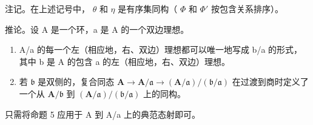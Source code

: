 注记。在上述记号中， \(\theta\) 和 \(\eta\) 是有序集同构（ \(\Phi\) 和 \(\Phi'\) 按包含关系排序）。

推论。设 A 是一个环，a 是 A 的一个双边理想。

\begin{enumerate}
\def\labelenumi{(\alph{enumi})}
\item
  A/a 的每一个左（相应地，右、双边）理想都可以唯一地写成 b/a 的形式，其中 b 是 A 的包含 a 的左（相应地，右、双边）理想。
\item
  若 \(\mathfrak{b}\) 是双侧的，复合同态 \(\mathbf{A} \to \mathbf{A} / \mathfrak{a} \to (\mathbf{A} / \mathfrak{a}) / (\mathfrak{b} / \mathfrak{a})\) 在过渡到商时定义了一个从 \(\mathbf{A} / \mathfrak{b}\) 到 \((\mathbf{A} / \mathfrak{a}) / (\mathfrak{b} / \mathfrak{a})\) 上的同构。
\end{enumerate}

只需将命题 5 应用于 A 到 A/a 上的典范态射即可。

